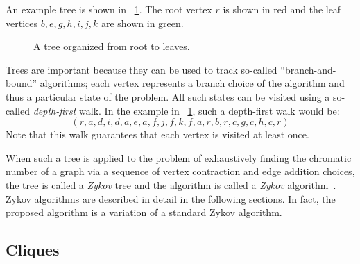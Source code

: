 An example tree is shown in \figurename~\ref{fig:tree}.  The root vertex \(r\) is shown in red and the leaf
vertices \(b,e,g,h,i,j,k\) are shown in green.

\begin{figure}[H]
  \centering
  \caption{A tree organized from root to leaves.}
  \label{fig:tree}
\end{figure}

Trees are important because they can be used to track so-called ``branch-and-bound'' algorithms; each vertex
represents a branch choice of the algorithm and thus a particular state of the problem.  All such states can be
visited using a so-called \emph{depth-first} walk.  In the example in \figurename~\ref{fig:tree}, such a
depth-first walk would be:
\[(r,a,d,i,d,a,e,a,f,j,f,k,f,a,r,b,r,c,g,c,h,c,r)\]
Note that this walk guarantees that each vertex is visited at least once.

When such a tree is applied to the problem of exhaustively finding the chromatic number of a graph via a sequence
of vertex contraction and edge addition choices, the tree is called a \emph{Zykov} tree and the algorithm is called
a \emph{Zykov} algorithm~\cite{mcdiarmid}.  Zykov algorithms are described in detail in the following sections.  In
fact, the proposed algorithm is a variation of a standard Zykov algorithm.

\subsection{Cliques}\label{sec:sub:cliques}

